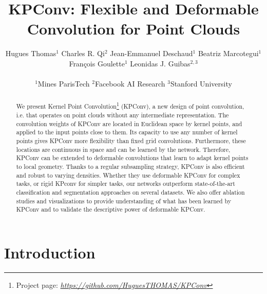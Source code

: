 \documentclass[10pt,twocolumn,letterpaper]{article}
\begin{document}
\title{KPConv: Flexible and Deformable Convolution for Point Clouds}

\author{
Hugues Thomas$^1$
\quad
Charles R. Qi$^2$
\quad
Jean-Emmanuel Deschaud$^1$
\quad
Beatriz Marcotegui$^1$
\\
Fran\c{c}ois Goulette$^1$
\quad
Leonidas J. Guibas$^{2,3}$
\\
\\
$^1$Mines ParisTech \quad $^2$Facebook AI Research \quad $^3$Stanford University
}


\maketitle

\ificcvfinal\thispagestyle{empty}\fi


\begin{abstract}
We present Kernel Point Convolution\footnote{Project page: \textit{\url{https://github.com/HuguesTHOMAS/KPConv}}} (KPConv), a new design of point convolution, i.e. that operates on point clouds without any intermediate representation. The convolution weights of KPConv are located in Euclidean space by kernel points, and applied to the input points close to them. Its capacity to use any number of kernel points gives KPConv more flexibility than fixed grid convolutions. Furthermore, these locations are continuous in space and can be learned by the network. Therefore, KPConv can be extended to deformable convolutions that learn to adapt kernel points to local geometry. Thanks to a regular subsampling strategy, KPConv is also efficient and robust to varying densities. Whether they use deformable KPConv for complex tasks, or rigid KPconv for simpler tasks, our networks outperform state-of-the-art classification and segmentation approaches on several datasets. We also offer ablation studies and visualizations to provide understanding of what has been learned by KPConv and to validate the descriptive power of deformable KPConv.
\end{abstract}

\section{Introduction}
\end{document}
